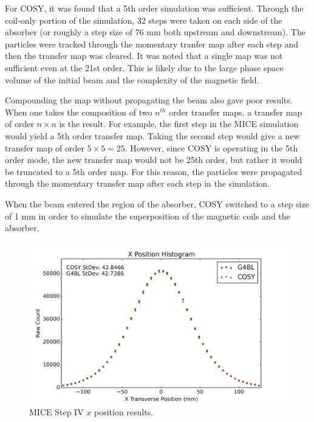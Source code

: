 For COSY, it was found that a 5th order simulation was sufficient. Through the coil-only portion of the simulation, 32 steps were taken on each side of the absorber (or roughly a step size of 76 mm both upstream and downstream). The particles were tracked through the momentary tranfer map after each step and then the transfer map was cleared. It was noted that a single map was not sufficient even at the 21st order. This is likely due to the large phase space volume of the initial beam and the complexity of the magnetic field.

Compounding the map without propagating the beam also gave poor results. When one takes the composition of two $n^{th}$ order transfer maps, a transfer map of order $n\times n$ is the result. For example, the first step in the MICE simulation would yield a 5th order transfer map. Taking the second step would give a new transfer map of order $5\times 5 = 25$. However, since COSY is operating in the 5th order mode, the new transfer map would not be 25th order, but rather it would be truncated to a 5th order map. For this reason, the particles were propagated through the momentary transfer map after each step in the simulation.

When the beam entered the region of the absorber, COSY switched to a step size of 1 mm in order to simulate the superposition of the magnetic coils and the absorber.

\begin{figure}[h!]
  \centering
    \includegraphics[width=\textwidth]{MICE data/MICE_1M_x} 
  \caption{MICE Step IV $x$ position results.}
  \label{fig:micex}
\end{figure}

